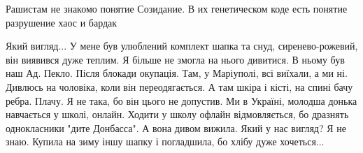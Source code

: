 
Рашистам не знакомо понятие Созидание. В их генетическом коде есть понятие
разрушение хаос и бардак


Який вигляд... У мене був улюблений комплект шапка та снуд, сиренево-рожевий,
він виявився дуже теплим. Я більше не змогла на нього дивитися. В ньому був наш
Ад. Пекло. Після блокади окупація. Там, у Маріуполі, всі виїхали, а ми ні.
Дивлюсь на чоловіка, коли він переодягається. А там шкіра і кісті, на спині
бачу ребра. Плачу. Я не така, бо він цього не допустив. Ми в Україні, молодша
донька навчається у школі, онлайн. Ходити у школу офлайн відмовляється, бо
дразнять однокласники "дите Донбасса". А вона дивом вижила. Який у нас вигляд?
Я не знаю. Купила на зиму іншу шапку і погладшила, бо хлібу дуже хочеться...

